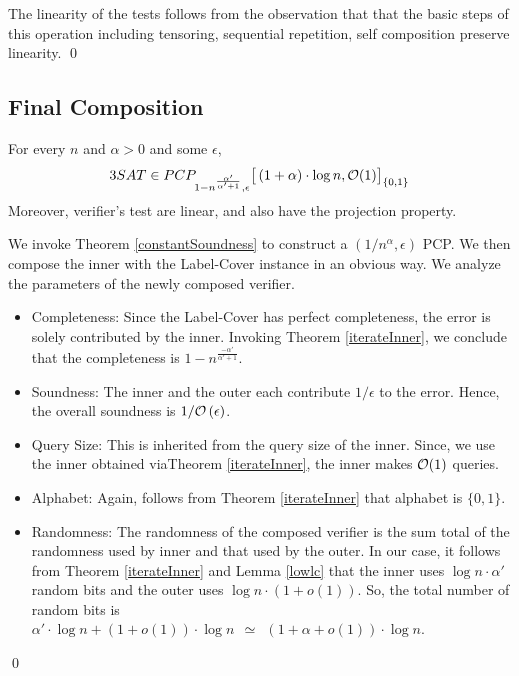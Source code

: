 \noindent The linearity of the tests follows from the observation that
that the basic steps of this operation including tensoring, sequential
repetition, self composition preserve linearity.  \qed


\subsection{Final Composition}

\begin{theorem}\label{constantSoundness}
  For every $n$ and $\alpha > 0$ and some $\epsilon$,
\[
3SAT \in PCP_{1 - {n^{\frac{\alpha'}{\alpha' + 1}}}, {\epsilon}} \big[ \left( 1 + \alpha \right) \cdot \log n, {\cal O}(1) \big ]_{\{0,1\}}
\]
Moreover, verifier's test are linear, and also have the projection
property.
\end{theorem}
  We invoke Theorem
\ref{constantSoundness} to construct a $(1/ n^\alpha,
  \epsilon)$ PCP. We then compose the inner with the
Label-Cover instance in an obvious way. We analyze the parameters of
the newly composed verifier.

\begin{itemize}
\item Completeness: Since the Label-Cover has perfect completeness,
  the error is solely contributed by the inner. Invoking Theorem
  \ref{iterateInner}, we conclude that the completeness is $1 - n^{\frac{-\alpha'}{\alpha' + 1}}$.

\item Soundness: The inner and the outer each contribute $1/\epsilon$
  to the error. Hence, the overall soundness is $1/{\cal
    O}\left(\epsilon\right)$.

\item Query Size: This is inherited from the query size of the
  inner. Since, we use the inner obtained viaTheorem \ref{iterateInner}, the
  inner makes ${\cal O}(1)$ queries.

\item Alphabet: Again, follows from Theorem \ref{iterateInner} that alphabet
  is $\{0,1\}$.

  \item Randomness: The randomness of the composed verifier is the sum
    total of the randomness used by inner and that used by the
    outer. In our case, it follows from Theorem \ref{iterateInner} and Lemma
    \ref{lowlc} that the inner uses $\log n \cdot \alpha'$ random bits and the outer uses $\log n \cdot \left(1
      +o(1)\right)$. So, the total number of random bits is $\alpha' \cdot \log n + \left(1 +
      o\left(1\right)\right) \cdot \log n \ \ \simeq \ \ \left(1 +
      \alpha + o(1)\right) \cdot \log n$.
\end{itemize}
\qed



